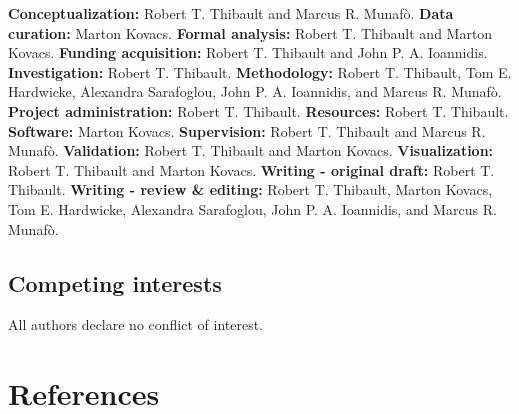 \documentclass[
  man,floatsintext]{apa6}
\begin{document}
\textbf{Conceptualization:} Robert T. Thibault and Marcus R. Munafò.
\textbf{Data curation:} Marton Kovacs.
\textbf{Formal analysis:} Robert T. Thibault and Marton Kovacs.
\textbf{Funding acquisition:} Robert T. Thibault and John P. A. Ioannidis.
\textbf{Investigation:} Robert T. Thibault.
\textbf{Methodology:} Robert T. Thibault, Tom E. Hardwicke, Alexandra Sarafoglou, John P. A. Ioannidis, and Marcus R. Munafò.
\textbf{Project administration:} Robert T. Thibault.
\textbf{Resources:} Robert T. Thibault.
\textbf{Software:} Marton Kovacs.
\textbf{Supervision:} Robert T. Thibault and Marcus R. Munafò.
\textbf{Validation:} Robert T. Thibault and Marton Kovacs.
\textbf{Visualization:} Robert T. Thibault and Marton Kovacs.
\textbf{Writing - original draft:} Robert T. Thibault.
\textbf{Writing - review \& editing:} Robert T. Thibault, Marton Kovacs, Tom E. Hardwicke, Alexandra Sarafoglou, John P. A. Ioannidis, and Marcus R. Munafò.

\hypertarget{competing-interests}{%
\subsection{Competing interests}\label{competing-interests}}

All authors declare no conflict of interest.

\newpage

\hypertarget{references}{%
\section{References}\label{references}}
\end{document}
